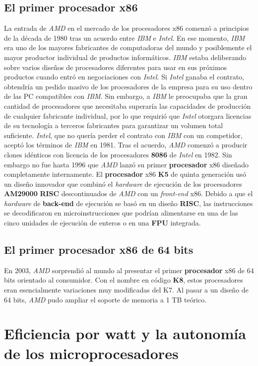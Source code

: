 \subsection{El primer \textbf{procesador} x86}
La entrada de \emph{AMD} en el mercado de los procesadores x86 comenzó a principios de la década de 1980 tras un acuerdo entre \emph{IBM} e \emph{Intel}. En ese momento, \emph{IBM}
era uno de los mayores fabricantes de computadoras del mundo y posiblemente el mayor productor individual de productos informáticos. \emph{IBM} estaba deliberando sobre varios diseños
de procesadores diferentes para usar en sus próximos productos cuando entró en negociaciones con \emph{Intel}. Si \emph{Intel} ganaba el contrato, obtendría un pedido masivo de los
procesadores de la empresa para su uso dentro de las PC compatibles con \emph{IBM}. Sin embargo, a \emph{IBM} le preocupaba que la gran cantidad de procesadores que necesitaba
superaría las capacidades de producción de cualquier fabricante individual, por lo que requirió que \emph{Intel} otorgara licencias de su tecnología a terceros fabricantes
para garantizar un volumen total suficiente. \emph{Intel}, que no quería perder el contrato con \emph{IBM} con un competidor, aceptó los términos de \emph{IBM} en 1981. Tras el acuerdo,
\emph{AMD} comenzó a producir clones idénticos con licencia de los procesadores \textbf{8086} de \emph{Intel} en 1982. Sin embargo no fue hasta 1996 que \emph{AMD} lanzó su primer
\textbf{procesador} x86 diseñado completamente internamente. El \textbf{procesador} x86 \textbf{K5} de quinta generación usó un diseño innovador que combinó el \emph{hardware} de
ejecución de los procesadores \textbf{AM29000} \textbf{RISC} descontinuados de \emph{AMD} con un \emph{front-end} x86. Debido a que el \emph{hardware} de \textbf{back-end} de ejecución
se basó en un diseño \textbf {RISC}, las instrucciones se decodificaron en microinstrucciones que podrían alimentarse en una de las cinco unidades de ejecución de enteros o en una
\textbf{FPU} integrada. 

\subsection{El primer \textbf{procesador} x86 de 64 bits}
En 2003, \emph{AMD} sorprendió al mundo al presentar el primer \textbf{procesador} x86 de 64 bits orientado al consumidor. Con el nombre en código \textbf{K8}, estos procesadores eran
esencialmente variaciones muy modificadas del K7. Al pasar a un diseño de 64 bits, \emph{AMD} pudo ampliar el soporte de memoria a 1 TB teórico.

\section{Eficiencia por watt y la autonomía de los microprocesadores}
